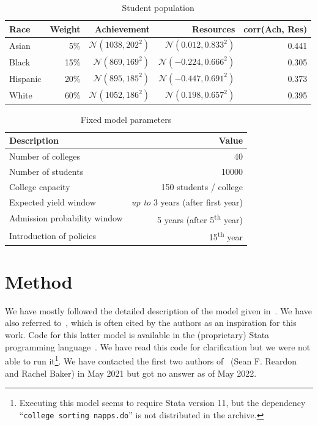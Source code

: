 \begin{table}[!ht]
    \centering
    \begin{tabular}{l r r r r} \toprule
        \textbf{Race} & \textbf{Weight} & \textbf{Achievement} & \textbf{Resources} & \textbf{corr(Ach, Res)} \\ \midrule
        Asian & 5\% & $\mathcal{N}(1038, 202^2)$ & $\mathcal{N}(0.012, 0.833^2)$ & 0.441 \\
        Black & 15\% & $\mathcal{N}(869, 169^2)$ & $\mathcal{N}(-0.224, 0.666^2)$ & 0.305 \\
        Hispanic & 20\% & $\mathcal{N}(895, 185^2)$ & $\mathcal{N}(-0.447, 0.691^2)$ & 0.373 \\
        White & 60\% & $\mathcal{N}(1052, 186^2)$ & $\mathcal{N}(0.198, 0.657^2)$ & 0.395 \\ \bottomrule
    \end{tabular}
    \caption{Student population}
    \label{tab:stud}
\end{table}

\begin{table}[!ht]
    \centering
    \begin{tabular}{l r} \toprule
        \textbf{Description} & \textbf{Value} \\ \midrule
        Number of colleges & 40 \\
        Number of students & 10000 \\

        College capacity & 150 students / college \\
        Expected yield window & \emph{up to} 3 years (after first year) \\
        Admission probability window & 5 years (after 5\textsuperscript{th} year) \\
        Introduction of policies & 15\textsuperscript{th} year \\ \bottomrule
    \end{tabular}
    \caption{Fixed model parameters}
    \label{tab:const}
\end{table}


\section{Method}

We have mostly followed the detailed description of the model given in~\cite[Appendix~C]{reardon2018levels}.
We have also referred to~\cite{reardon2016agent}, which is often cited by the authors as an inspiration for this work.
Code for this latter model is available in the (proprietary) Stata programming language~\cite{reardon2016stata}.
We have read this code for clarification but we were not able to run it\footnote{Executing this model seems to require Stata version 11, but the dependency ``\texttt{college sorting napps.do}'' is not distributed in the archive.}.
We have contacted the first two authors of~\cite{reardon2018levels} (Sean F. Reardon and Rachel Baker) in May 2021 but got no answer as of May 2022.

